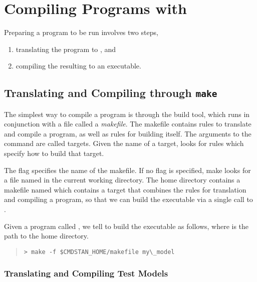 \chapter{Compiling \Stan Programs with  \CmdStan}\label{compiling.chapter}

\noindent
Preparing a \Stan program to be run involves two steps,
%
\begin{enumerate}
\item translating the \Stan program to \Cpp, and
\item compiling the resulting \Cpp to an executable.
\end{enumerate}
%

\section{Translating and Compiling through {\tt\bfseries make}}\label{make-models.section}

The simplest way to compile a \Stan program is through the 
build tool, which runs in conjunction with a file called a \emph{makefile}.
The makefile contains rules to translate and compile a \Stan program,
as well as rules for building \CmdStan itself.
The arguments to the  command are called targets.
Given the name of a target,  looks for rules which
specify how to build that target.

The  flag specifies the name of the makefile.
If no  flag is specified, make looks for a file named 
in the current working directory.
The \CmdStan home directory contains a makefile named 
which contains a target that 
combines the rules for translation and compiling a \Stan program,
so that we can build the \CmdStan executable via a single call to .

Given a \Stan program called ,
we tell  to build the executable 
as follows, where  is the path to the
\CmdStan home directory.
%
\begin{quote}
\begin{Verbatim}[fontshape=sl]
> make -f $CMDSTAN_HOME/makefile my\_model
\end{Verbatim}
\end{quote}

\subsection{Translating and Compiling Test Models}

